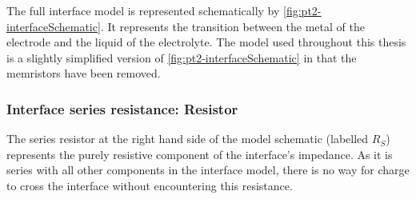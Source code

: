     The full interface model is represented schematically by \cref{fig:pt2-interfaceSchematic}.
    It represents the transition between the metal of the electrode and the liquid of the electrolyte.
    The model used throughout this thesis is a slightly simplified version of \cref{fig:pt2-interfaceSchematic} in that the memristors have been removed.








    \subsubsection{Interface series resistance: Resistor}
      The series resistor at the right hand side of the model schematic (labelled $R_{S}$) represents the purely resistive component of the interface's impedance.
      As it is series with all other components in the interface model, there is no way for charge to cross the interface without encountering this resistance.

